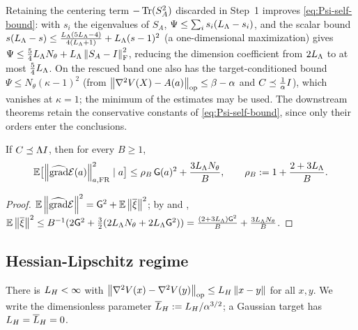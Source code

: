 \begin{remark}
\label{rem:selfbound-sharp}
Retaining the centering term $-\operatorname{Tr}(S_A^2)$ discarded in Step~1 improves \eqref{eq:Psi-self-bound}:
with $s_i$ the eigenvalues of $S_A$, $\Psi\leq\sum_is_i(L_\Lambda-s_i)$, and the scalar bound
$s(L_\Lambda-s)\leq\tfrac{L_\Lambda(5L_\Lambda-4)}{4(L_\Lambda+1)}+L_\Lambda(s-1)^2$ (a one-dimensional maximization) gives
$\Psi\leq\tfrac54L_\Lambda N_\theta+L_\Lambda\left\lVert S_A-I\right\rVert_{\mathrm{F}}^2$, reducing the dimension coefficient from
$2L_\Lambda$ to at most $\tfrac54L_\Lambda$. On the rescued band one also has the target-conditioned bound
$\Psi\leq N_\theta(\kappa-1)^2$ (from $\left\lVert \nabla^2V(X)-A(a)\right\rVert_{\mathrm{op}}\leq\beta-\alpha$ and
$C\preceq\tfrac1\alpha I$), which vanishes at $\kappa=1$; the minimum of the estimates may be used.
The downstream theorems retain the conservative constants of \eqref{eq:Psi-self-bound}, since only
their orders enter the conclusions.
\end{remark}

\begin{corollary}
\label{cor:second-moment}
If $C\preceq\Lambda I$, then for every $B\geq1$,
\begin{equation}
\label{eq:second-moment}
    \mathbb{E}\bigl[\left\lVert \widehat{\operatorname{grad}}\mathcal{E}(a)\right\rVert_{a,\mathrm{FR}}^2\mid a\bigr]
    \leq\rho_B\,\mathsf{G}(a)^2+\frac{3L_\Lambda N_\theta}B,
    \qquad
    \rho_B:=1+\frac{2+3L_\Lambda}B .
\end{equation}
\end{corollary}

\begin{proof}
$\mathbb{E}\left\lVert \widehat{\operatorname{grad}}\mathcal{E}\right\rVert^2=\mathsf{G}^2+\mathbb{E}\left\lVert \overline\xi\right\rVert^2$; by  and
,
$\mathbb{E}\left\lVert \overline\xi\right\rVert^2\leq B^{-1}(2\mathsf{G}^2+\tfrac32(2L_\Lambda N_\theta+2L_\Lambda\mathsf{G}^2))=\tfrac{(2+3L_\Lambda)\mathsf{G}^2}B+\tfrac{3L_\Lambda N_\theta}B$.
\end{proof}

\subsection{Hessian-Lipschitz regime}
\label{sec:stoch-Hlip}

\begin{assumption}
\label{assump:global-Hess-Lip}
There is $L_H<\infty$ with $\left\lVert \nabla^2V(x)-\nabla^2V(y)\right\rVert_{\mathrm{op}}\leq L_H\left\lVert x-y\right\rVert$ for all $x,y$. We
write the dimensionless parameter $\overline{L}_H:=L_H/\alpha^{3/2}$; a Gaussian target has $L_H=\overline{L}_H=0$.
\end{assumption}

